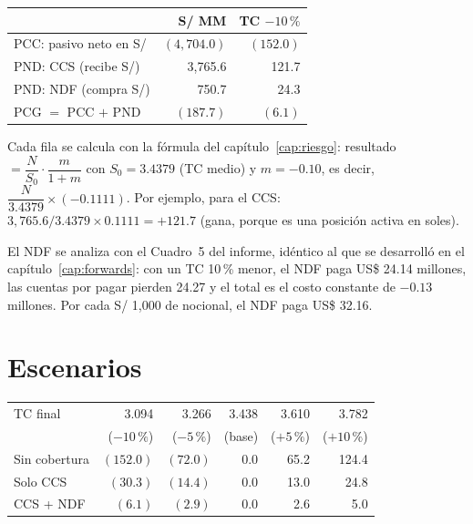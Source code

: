 \begin{center}\small
{}\label{tab:c5}
\begin{tabularx}{\linewidth}{@{}>{\raggedright\arraybackslash}Xrr@{}}
\toprule
& S/ MM & TC $-10\,\%$\\
\midrule
PCC: pasivo neto en S/ & $(4{,}704.0)$ & $(152.0)$\\
PND: CCS (recibe S/) & 3,765.6 & 121.7\\
PND: NDF (compra S/) & 750.7 & 24.3\\
\midrule
PCG $=$ PCC $+$ PND & $(187.7)$ & $(6.1)$\\
\bottomrule
\end{tabularx}
\end{center}

Cada fila se calcula con la fórmula del capítulo~\ref{cap:riesgo}: resultado $=\dfrac{N}{S_0}\cdot\dfrac{m}{1+m}$ con $S_0=3.4379$ (TC medio) y $m=-0.10$, es decir, $\dfrac{N}{3.4379}\times(-0.1111)$. Por ejemplo, para el CCS: $3{,}765.6/3.4379\times0.1111=+121.7$ (gana, porque es una posición activa en soles).

El NDF se analiza con el Cuadro~5 del informe, idéntico al que se desarrolló en el capítulo~\ref{cap:forwards}: con un TC 10\,\% menor, el NDF paga US\$ 24.14 millones, las cuentas por pagar pierden 24.27 y el total es el costo constante de $-0.13$ millones. Por cada S/ 1,000 de nocional, el NDF paga US\$ 32.16.

\section{Escenarios}

\begin{center}\small
{}\label{tab:c7}
\begin{tabular}{@{}lrrrrr@{}}
\toprule
TC final & 3.094 & 3.266 & 3.438 & 3.610 & 3.782\\
& ($-10\,\%$) & ($-5\,\%$) & (base) & ($+5\,\%$) & ($+10\,\%$)\\
\midrule
Sin cobertura & $(152.0)$ & $(72.0)$ & 0.0 & 65.2 & 124.4\\
Solo CCS & $(30.3)$ & $(14.4)$ & 0.0 & 13.0 & 24.8\\
CCS + NDF & $(6.1)$ & $(2.9)$ & 0.0 & 2.6 & 5.0\\
\bottomrule
\end{tabular}
\end{center}

